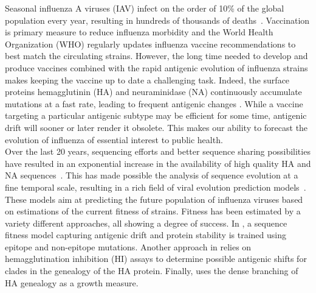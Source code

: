 \documentclass{article}
\begin{document}
	Seasonal influenza A viruses (IAV) infect on the order of 10\% of the global population every year, resulting in hundreds of thousands of deaths~\cite{WHOfactsheet,petrova_evolution_2017}. Vaccination is primary measure to reduce influenza morbidity and the World Health Organization (WHO) regularly updates influenza vaccine recommendations to best match the circulating strains. However, the long time needed to develop and produce vaccines combined with the rapid antigenic evolution of influenza strains makes keeping the vaccine up to date a challenging task. Indeed, the surface proteins hemagglutinin (HA) and neuraminidase (NA) continuously accumulate mutations at a fast rate, leading to frequent antigenic changes \cite{petrova_evolution_2017, Shih6283, koelle2009understanding}. While a vaccine targeting a particular antigenic subtype may be efficient for some time, antigenic drift will sooner or later render it obsolete. This makes our ability to forecast the evolution of influenza of essential interest to public health. \\
	Over the last 20 years, sequencing efforts and better sequence sharing possibilities have resulted in an exponential increase in the availability of high quality HA and NA sequences~\cite{bogner2006global, shu2017gisaid}. This has made possible the analysis of sequence evolution at a fine temporal scale, resulting in a rich field of viral evolution prediction models~\cite{morris2018predictive}. These models aim at predicting the future population of influenza viruses based on estimations of the current fitness of strains. Fitness has been estimated by a variety different approaches, all showing a degree of success. In \cite{luksza_predictive_2014}, a sequence fitness model capturing antigenic drift and protein stability is trained using epitope and non-epitope mutations. Another approach in \cite{Steinbrueck12123} relies on hemagglutination inhibition (HI) assays to determine possible antigenic shifts for clades in the genealogy of the HA protein. Finally, \cite{neher_predicting_2014} uses the dense branching of HA genealogy as a growth measure. \\
\end{document}
